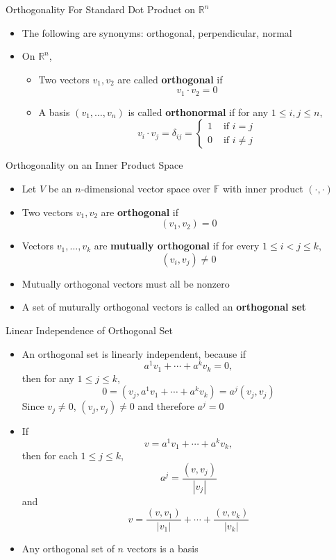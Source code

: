 \documentclass[usenames,dvipsnames,10pt]{beamer}
\newcommand\F{\mathbb{F}}
\newcommand{\R}{\mathbb{R}}
\begin{document}
\begin{frame}
  {Orthogonality For Standard Dot Product on $\R^n$}

  \begin{itemize}
  \item The following are synonyms: orthogonal, perpendicular, normal
  \item On $\R^n$,
    \begin{itemize}
    \item Two vectors $v_1, v_2$ are called {\bf orthogonal} if
      \[
        v_1\cdot v_2 = 0
      \]
    \item A basis $(v_1, \dots, v_n)$ is called {\bf orthonormal} if for any $1 \le i, j \le n$,
      \[
        v_i\cdot v_j = \delta_{ij} =
        \begin{cases} 1 &\text{ if }i=j\\
          0 &\text{ if }i \ne j
        \end{cases}
      \]
    \end{itemize}
  \end{itemize}
\end{frame}

\begin{frame}
  {Orthogonality on an Inner Product Space}

  \begin{itemize}
  \item Let $V$ be an $n$-dimensional vector space over $\F$ with inner product $(\cdot,\cdot)$
  \item Two vectors $v_1, v_2$ are {\bf orthogonal} if
    \[
      (v_1,v_2) = 0
    \]
  \item Vectors $v_1, \dots, v_k$ are {\bf mutually orthogonal} if for every $1 \le i < j \le k$,
    \[
      (v_i,v_j) \ne 0
    \]
  \item Mutually orthogonal vectors must all be nonzero
  \item A set of muturally orthogonal vectors is called an {\bf orthogonal set}
  \end{itemize}
\end{frame}

\begin{frame}
  {Linear Independence of Orthogonal Set}
  
  \begin{itemize}
  \item An orthogonal set is linearly independent, because if
    \[
      a^1v_1 + \cdots + a^kv_k = 0,
    \]
    then for any $1 \le j \le k$,
    \[
      0 = (v_j,a^1v_1 + \cdots + a^kv_k) = a^j(v_j,v_j)
    \]
    Since $v_j \ne 0$, $(v_j,v_j) \ne 0$ and therefore $a^j = 0$
  \item If
    \[
      v = a^1v_1 + \cdots + a^kv_k,
    \]
    then for each $1 \le j \le k$,
    \[
      a^j = \frac{(v,v_j)}{|v_j|}
    \]
    and
    \[
      v = \frac{(v,v_1)}{|v_1|} + \cdots + \frac{(v,v_k)}{|v_k|}
    \]
  \item Any orthogonal set of $n$ vectors is a basis
  \end{itemize}
\end{frame}
\end{document}

